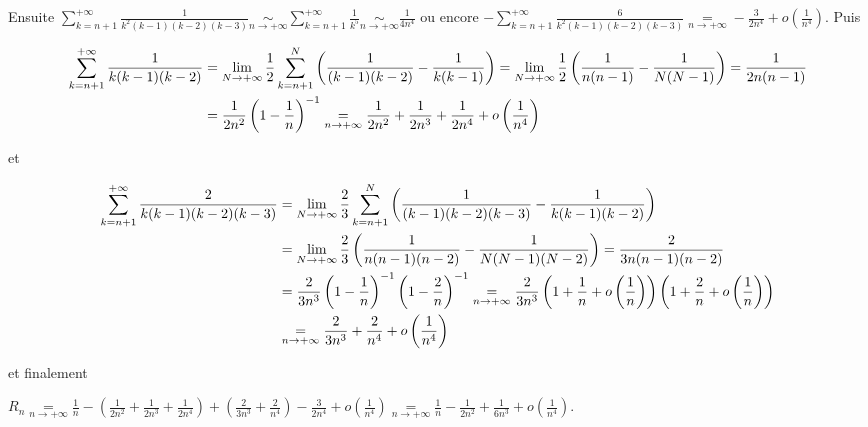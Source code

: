 {{Ensuite  $\sum_{k=n+1}^{+\infty}\frac{1}{k^2(k-1)(k-2)(k-3)}\underset{n\rightarrow+\infty}{\sim}\sum_{k=n+1}^{+\infty}\frac{1}{k^5}\underset{n\rightarrow+\infty}{\sim}\frac{1}{4n^4}$ ou encore $-\sum_{k=n+1}^{+\infty}\frac{6}{k^2(k-1)(k-2)(k-3)}\underset{n\rightarrow+\infty}{=}-\frac{3}{2n^4}+o\left(\frac{1}{n^4}\right)$. Puis

\begin{align*}\ensuremath
\sum_{k=n+1}^{+\infty}\frac{1}{k(k-1)(k-2)}&=\lim_{N \rightarrow +\infty}\frac{1}{2}\sum_{k=n+1}^{N}\left(\frac{1}{(k-1)(k-2)}-\frac{1}{k(k-1)}\right)=\lim_{N \rightarrow +\infty}\frac{1}{2}\left(\frac{1}{n(n-1)}-\frac{1}{N(N-1)}\right)=\frac{1}{2n(n-1)}\\
 &=\frac{1}{2n^2}\left(1-\frac{1}{n}\right)^{-1}\underset{n\rightarrow+\infty}{=}\frac{1}{2n^2}+\frac{1}{2n^3}+\frac{1}{2n^4}+o\left(\frac{1}{n^4}\right)
\end{align*}

et

\begin{align*}\ensuremath
\sum_{k=n+1}^{+\infty}\frac{2}{k(k-1)(k-2)(k-3)}&=\lim_{N \rightarrow +\infty}\frac{2}{3}\sum_{k=n+1}^{N}\left(\frac{1}{(k-1)(k-2)(k-3)}-\frac{1}{k(k-1)(k-2)}\right)\\
 &=\lim_{N \rightarrow +\infty}\frac{2}{3}\left(\frac{1}{n(n-1)(n-2)}-\frac{1}{N(N-1)(N-2)}\right)=\frac{2}{3n(n-1)(n-2)}\\
 &=\frac{2}{3n^3}\left(1-\frac{1}{n}\right)^{-1}\left(1-\frac{2}{n}\right)^{-1}\underset{n\rightarrow+\infty}{=}\frac{2}{3n^3}\left(1+\frac{1}{n}+o\left(\frac{1}{n}\right)\right)\left(1+\frac{2}{n}+o\left(\frac{1}{n}\right)\right)\\
  &\underset{n\rightarrow+\infty}{=}\frac{2}{3n^3}+\frac{2}{n^4}+o\left(\frac{1}{n^4}\right)
\end{align*}

et finalement

\begin{center}
$R_n\underset{n\rightarrow+\infty}{=}\frac{1}{n}-\left(\frac{1}{2n^2}+\frac{1}{2n^3}+\frac{1}{2n^4}\right)+\left(\frac{2}{3n^3}+\frac{2}{n^4}\right)-\frac{3}{2n^4}+o\left(\frac{1}{n^4}\right)\underset{n\rightarrow+\infty}{=}\frac{1}{n}-\frac{1}{2n^2}+\frac{1}{6n^3}+o\left(\frac{1}{n^4}\right)$.
\end{center}

\begin{center}
\end{center}
}
}
